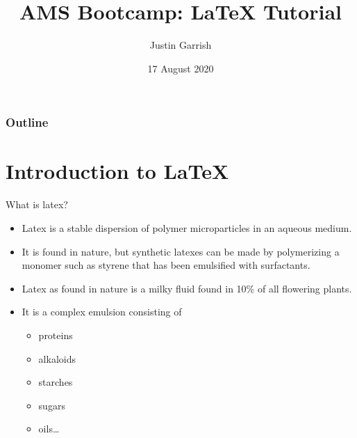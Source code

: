 \documentclass{beamer}
\title[\LaTeX Tutorial]{AMS Bootcamp: LaTeX Tutorial}
\author{Justin Garrish}
\institute[CSM]{Colorado School of Mines}
\date[17 Aug 2020]{17 August 2020}
\begin{document}

\frame{\titlepage}

\begin{frame}
\frametitle{Outline}
\tableofcontents
\end{frame}

\section{Introduction to LaTeX} %
\begin{frame}{What is latex?}
	\begin{itemize}
		\item Latex is a stable dispersion of polymer microparticles in an aqueous medium.
		\item It is found in nature, but synthetic latexes can be made by polymerizing a monomer such as styrene that has been emulsified with surfactants.
		\item Latex as found in nature is a milky fluid found in 10\% of all flowering plants.
		\item It is a complex emulsion consisting of 
			\begin{itemize}
				\item proteins
				\item alkaloids
				\item starches
				\item sugars
				\item oils\dots
			\end{itemize}
	\end{itemize}
\end{frame}
\end{document}
